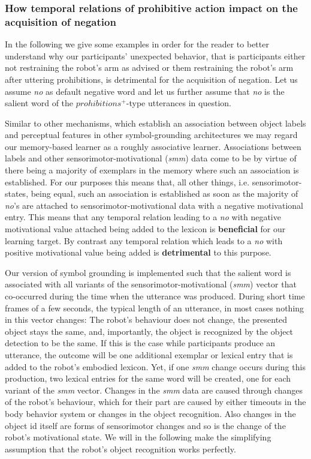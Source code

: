 \begin{screenonly}
\subsubsection{How temporal relations of prohibitive action impact on the acquisition of negation}\hfill \break
In the following we give some examples in order for the reader to better understand why our participants' unexpected behavior, that is participants
either not restraining the robot's arm as advised or them restraining the robot's arm after uttering prohibitions, is detrimental for the acquisition of
negation.
Let us assume \emph{no} as default negative word and let us further assume that \emph{no} is the salient word of the $prohibitions^+$-type utterances
in question.

Similar to other mechanisms, which establish an association between object labels and perceptual features in other symbol-grounding architectures we may regard our
memory-based learner as a roughly associative learner. Associations between labels and other sensorimotor-motivational (\emph{smm}) data come to be by virtue of there
being a majority of exemplars in the memory where such an association is established. For our purposes this means that, all other things, i.e. sensorimotor-states,
being equal, such an association is established as soon as the majority of \emph{no}'s are attached to sensorimotor-motivational data with a negative motivational
entry. This means that any temporal relation leading to a \emph{no} with negative motivational value attached being added to the lexicon is \textbf{beneficial}
for our learning target. By contrast any temporal relation which leads to a \emph{no} with positive motivational value being added is \textbf{detrimental} to
this purpose.

Our version of symbol grounding is implemented such that the salient word is associated with all variants of the sensorimotor-motivational (\emph{smm}) 
vector that co-occurred during the time when the utterance was produced. During short time frames of a few seconds, the typical length of an utterance, 
in most cases nothing in this vector changes: The robot's behaviour does not change, the presented object stays the same, and, importantly, 
the object is recognized by the object detection to be the same. If this is the case while participants produce an utterance, the outcome will be one 
additional exemplar or lexical entry that is added to the robot's embodied lexicon. Yet, if one \emph{smm} change occurs during this production, two 
lexical entries for the same word will be created, one for each variant of the \emph{smm} vector.
Changes  in the \emph{smm} data are caused through changes of the robot's behaviour, which for their part are caused by either timeouts in the body behavior
system or changes in the object recognition. Also changes in the object id itself are forms of sensorimotor changes and so is the change of the robot's
motivational state. We will in the following make the simplifying assumption that the robot's object recognition works perfectly.


\end{screenonly}
